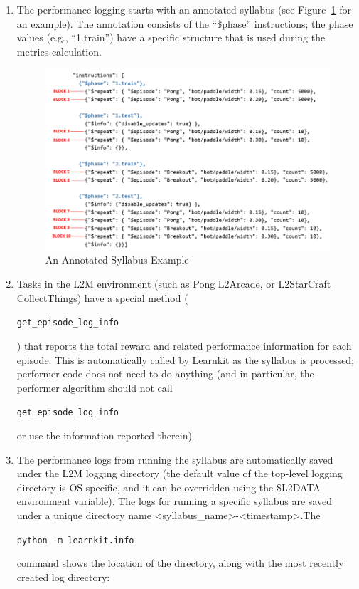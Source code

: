 \begin{enumerate}
\item The performance logging starts with an annotated syllabus (see Figure~\ref{fig:annotated_syllabus} for an example). The annotation consists of the “\$phase” instructions; the phase values (e.g., “1.train”) have a specific structure that is used during the metrics calculation.\\[0.4in]

\begin{figure}[h]
	\centering
	\includegraphics[width=0.8\columnwidth]{sections/figs/syllabus_annotated_blocks.png}
	\caption{An Annotated Syllabus Example}
	\label{fig:annotated_syllabus}
\end{figure}


\item Tasks in the L2M environment (such as Pong L2Arcade, or L2StarCraft CollectThings) have a special method (
\begin{small}
\verb|get_episode_log_info| 
\end{small}
) that reports the total reward and related performance information for each episode. This is automatically called by Learnkit as the syllabus is processed; performer code does not need to do anything (and in particular, the performer algorithm should not call 
\begin{small}
\verb|get_episode_log_info| 
\end{small}
or use the information reported therein).\\[0.1in]

\item The performance logs from running the syllabus are automatically saved under the L2M logging directory (the default value of the top-level logging directory is OS-specific, and it can be overridden using the \$L2DATA environment variable). The logs for running a specific syllabus are saved under a unique directory name <syllabus\_name>-<timestamp>.The
\begin{small}
\verb|python -m learnkit.info|
\end{small}
command shows the location of the directory, along with the most recently created log directory:\\[0.1in]


\end{enumerate}
